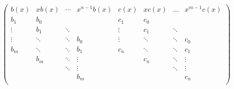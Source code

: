 \documentclass[11pt]{article} %
\begin{document}
\[
\begin{pmatrix}
b(x)   & xb(x)  & \cdots  & x^{n-1}b(x) & c(x) & xc(x) & \dots & x^{m-1}c(x) \\
b_1    & b_0    &        &        & c_1    & c_0 \\
\vdots & b_1    & \ddots &        & \vdots & c_1 & \ddots & \\
\vdots & \ddots & \ddots & b_0   & \vdots & \ddots & \ddots & c_0 \\
b_m    & \ddots & \ddots & b_1   & c_n    & \ddots & \ddots & c_1 \\
       & b_m    & \ddots & \vdots &        & c_n    & \ddots & \vdots \\
       &        & \ddots & \vdots    &        &        & \ddots & \vdots \\
       &        &        & b_m    &        &        &        & c_n \\
\end{pmatrix}
\]
\end{document}
